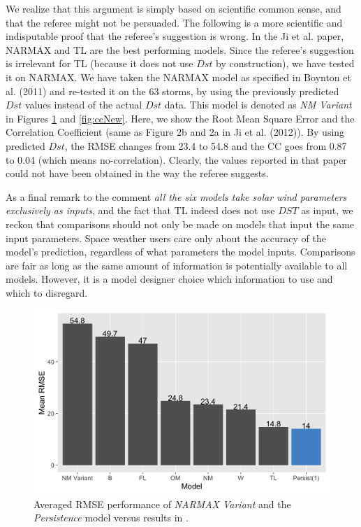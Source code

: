 \documentclass{article}
\begin{document}
\begin{enumerate}
We realize that this argument is simply based on scientific common sense, and that the referee might not be persuaded. The following is a more scientific and indisputable proof that the referee's suggestion is wrong.
In the Ji et al. paper, NARMAX and TL are the best performing models. Since the referee's suggestion is irrelevant for TL (because it does not use $Dst$ by construction), we have tested it on NARMAX.
We have taken the NARMAX model as specified in Boynton et al. (2011) and re-tested it on the 63 storms, by using the previously predicted $Dst$ values instead of the actual $Dst$ data. This model is denoted as \emph{NM Variant} in
Figures \ref{fig:rmseNew} and \ref{fig:ccNew}. Here, we show the Root Mean Square Error and the Correlation Coefficient (same as Figure 2b and 2a in Ji et al. (2012)). By using predicted $Dst$, the RMSE changes from 23.4 to 54.8 and the CC goes from 0.87 to 0.04 (which means no-correlation). 
Clearly, the values reported in that paper could not have been obtained in the way the referee suggests. 

As a final remark to the comment \emph{all the six models take solar wind parameters exclusively as inputs}, and the fact that TL indeed does not use $DST$ as input, we reckon that comparisons should not only be made on models that input the same input parameters. Space weather users care only about the accuracy of the model’s prediction, regardless of what parameters the model inputs. Comparisons are fair as long as the same amount of information is potentially available to all models. However, it is a model designer choice which information to use and which to disregard.

\begin{figure}[h]
   \centering
   \includegraphics[width=\textwidth]{Compare_RMSE_New.png}
      \caption{
      Averaged RMSE performance of \emph{NARMAX Variant} and the 
      \emph{Persistence} model versus results in \cite{Ji2012}.
      }
      \label{fig:rmseNew}
\end{figure}


\end{enumerate}
\end{document}
